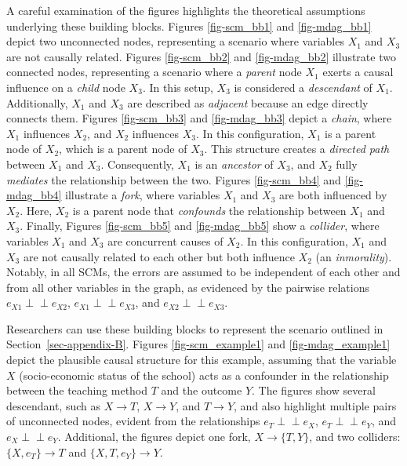 \documentclass[
  authoryear,
  review,
  1p]{elsarticle}
\begin{document}
A careful examination of the figures highlights the theoretical
assumptions underlying these building blocks. Figures \ref{fig-scm_bb1}
and \ref{fig-mdag_bb1} depict two unconnected nodes, representing a
scenario where variables \(X_{1}\) and \(X_{3}\) are not causally
related. Figures \ref{fig-scm_bb2} and \ref{fig-mdag_bb2} illustrate two
connected nodes, representing a scenario where a \emph{parent} node
\(X_{1}\) exerts a causal influence on a \emph{child} node \(X_{3}\). In
this setup, \(X_{3}\) is considered a \emph{descendant} of \(X_{1}\).
Additionally, \(X_{1}\) and \(X_{3}\) are described as \emph{adjacent}
because an edge directly connects them. Figures \ref{fig-scm_bb3} and
\ref{fig-mdag_bb3} depict a \emph{chain}, where \(X_{1}\) influences
\(X_{2}\), and \(X_{2}\) influences \(X_{3}\). In this configuration,
\(X_{1}\) is a parent node of \(X_{2}\), which is a parent node of
\(X_{3}\). This structure creates a \emph{directed path} between
\(X_{1}\) and \(X_{3}\). Consequently, \(X_{1}\) is an \emph{ancestor}
of \(X_{3}\), and \(X_{2}\) fully \emph{mediates} the relationship
between the two. Figures \ref{fig-scm_bb4} and \ref{fig-mdag_bb4}
illustrate a \emph{fork}, where variables \(X_{1}\) and \(X_{3}\) are
both influenced by \(X_{2}\). Here, \(X_{2}\) is a parent node that
\emph{confounds} the relationship between \(X_{1}\) and \(X_{3}\).
Finally, Figures \ref{fig-scm_bb5} and \ref{fig-mdag_bb5} show a
\emph{collider}, where variables \(X_{1}\) and \(X_{3}\) are concurrent
causes of \(X_{2}\). In this configuration, \(X_{1}\) and \(X_{3}\) are
not causally related to each other but both influence \(X_{2}\) (an
\emph{inmorality}). Notably, in all SCMs, the errors are assumed to be
independent of each other and from all other variables in the graph, as
evidenced by the pairwise relations \(e_{X1} \perp\!\!\!\perp e_{X2}\),
\(e_{X1} \perp\!\!\!\perp e_{X3}\), and
\(e_{X2} \perp\!\!\!\perp e_{X3}\).

Researchers can use these building blocks to represent the scenario
outlined in Section~\ref{sec-appendix-B}. Figures \ref{fig-scm_example1}
and \ref{fig-mdag_example1} depict the plausible causal structure for
this example, assuming that the variable \(X\) (socio-economic status of
the school) acts as a confounder in the relationship between the
teaching method \(T\) and the outcome \(Y\). The figures show several
descendant, such as \(X \rightarrow T\), \(X \rightarrow Y\), and
\(T \rightarrow Y\), and also highlight multiple pairs of unconnected
nodes, evident from the relationships \(e_{T} \perp\!\!\!\perp e_{X}\),
\(e_{T} \perp\!\!\!\perp e_{Y}\), and \(e_{X} \perp\!\!\!\perp e_{Y}\).
Additional, the figures depict one fork, \(X \rightarrow \{T, Y\}\), and
two colliders: \(\{X, e_{T}\} \rightarrow T\) and
\(\{X, T, e_{Y}\} \rightarrow Y\).
\end{document}
